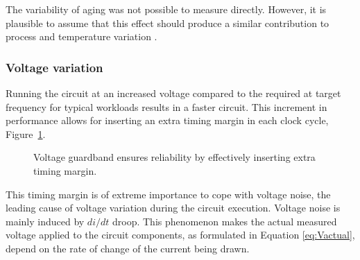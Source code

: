 The variability of aging was not possible to measure directly. However, it is plausible to assume that this effect should produce a similar contribution to process and temperature variation \cite{leng_safe_2015}.

\subsubsection{Voltage variation}

Running the circuit at an increased voltage compared to the required at target frequency for typical workloads results in a faster circuit. This increment in performance allows for inserting an extra timing margin in each clock cycle, Figure~\ref{fig:timming_guardband}. 

\begin{figure}[!htb]
  \begin{subfigmatrix}{2}
  \end{subfigmatrix}
  \caption{Voltage guardband ensures reliability by effectively inserting extra timing margin.}
  \label{fig:timming_guardband}
\end{figure}

This timing margin is of extreme importance to cope with voltage noise, the leading cause of voltage variation during the circuit execution. Voltage noise is mainly induced by $di/dt$ droop. This phenomenon makes the actual measured voltage applied to the circuit components, as formulated in Equation \ref{eq:Vactual}, depend on the rate of change of the current being drawn. 

